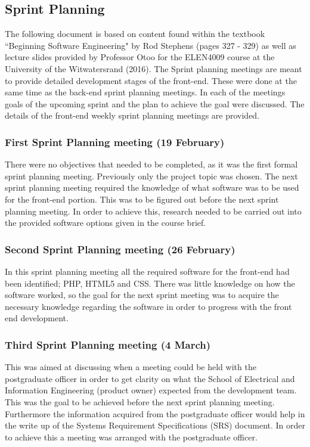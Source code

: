 \documentclass[journal]{IEEEtran}
\begin{document}
\subsection{Sprint Planning}
The following document is based on content found within the textbook ``Beginning Software Engineering" by Rod Stephens (pages 327 - 329) as well as lecture slides provided by Professor Otoo for the ELEN4009 course at the University of the Witwatersrand (2016). The Sprint planning meetings are meant to provide detailed development stages of the front-end. These were done at the same time as the back-end sprint planning meetings. In each of the meetings goals of the upcoming sprint and the plan to achieve the goal were discussed.  The details of the front-end weekly sprint planning meetings are provided.
\hfill \break \subsubsection{First Sprint Planning meeting (19 February)}
There were no objectives that needed to be completed, as it was the first formal sprint planning meeting. Previously only the project topic was chosen. The next sprint planning meeting required the knowledge of what software was to be used for the front-end portion. This was to be figured out before the next sprint planning meeting. In order to achieve this, research needed to be carried out into the provided software options given in the course brief.
\hfill \break \subsubsection{Second Sprint Planning meeting (26 February)}
In this sprint planning meeting all the required software for the front-end had been identified; PHP, HTML5 and CSS. There was little knowledge on how the software worked, so the goal for the next sprint meeting was to acquire the necessary knowledge regarding the software in order to progress with the front end development. 
\hfill \break \subsubsection{Third Sprint Planning meeting (4 March)}
This was aimed at discussing when a meeting could be held with the postgraduate officer in order to get clarity on what the School of Electrical and Information Engineering (product owner) expected from the development team. This was the goal to be achieved before the next sprint planning meeting.  Furthermore the information acquired from the postgraduate officer would help in the write up of the Systems Requirement Specifications (SRS) document.  In order to achieve this a meeting was arranged with the postgraduate officer.
\end{document}
